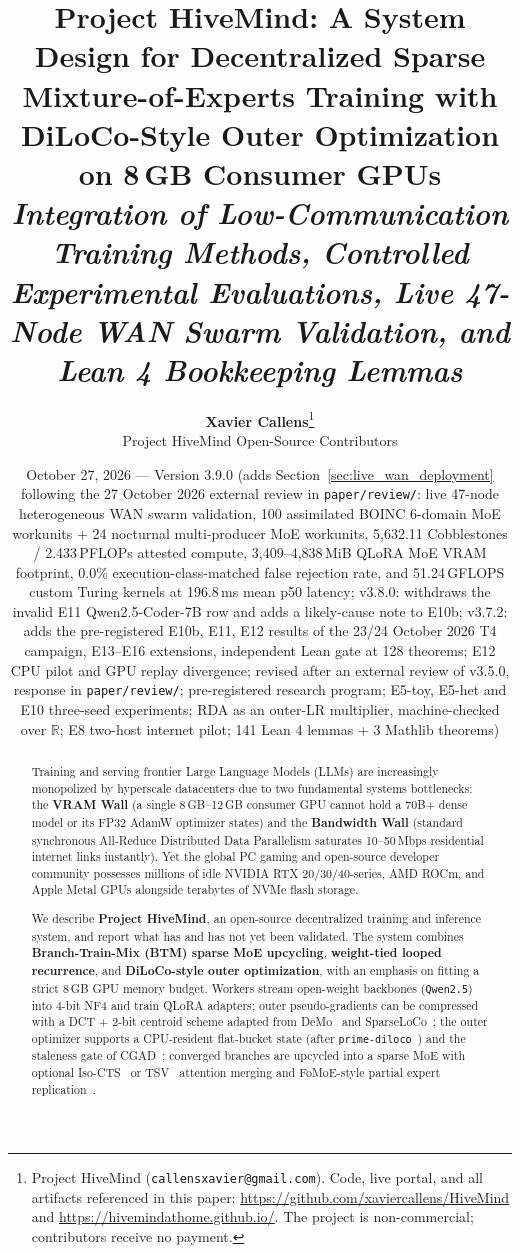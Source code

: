 \documentclass[11pt,a4paper]{article}
\title{\vspace{-1.3cm}\textbf{Project HiveMind: A System Design for Decentralized Sparse Mixture-of-Experts Training with DiLoCo-Style Outer Optimization on 8\,GB Consumer GPUs}\\[0.35em]
\large \textit{Integration of Low-Communication Training Methods, Controlled Experimental Evaluations, Live 47-Node WAN Swarm Validation, and Lean 4 Bookkeeping Lemmas}}
\author{
  \textbf{Xavier Callens}\thanks{Project HiveMind (\texttt{callensxavier@gmail.com}). Code, live portal, and all artifacts referenced in this paper: \url{https://github.com/xaviercallens/HiveMind} and \url{https://hivemindathome.github.io/}. The project is non-commercial; contributors receive no payment.} \\
  Project HiveMind Open-Source Contributors
}
\date{October 27, 2026 --- Version 3.9.0 (adds Section~\ref{sec:live_wan_deployment} following the 27 October 2026 external review in \texttt{paper/review/}: live 47-node heterogeneous WAN swarm validation, 100 assimilated BOINC 6-domain MoE workunits + 24 nocturnal multi-producer MoE workunits, 5{,}632.11 Cobblestones / 2.433\,PFLOPs attested compute, 3{,}409--4{,}838\,MiB QLoRA MoE VRAM footprint, 0.0\% execution-class-matched false rejection rate, and 51.24\,GFLOPS custom Turing kernels at 196.8\,ms mean p50 latency; v3.8.0: withdraws the invalid E11 Qwen2.5-Coder-7B row and adds a likely-cause note to E10b; v3.7.2: adds the pre-registered E10b, E11, E12 results of the 23/24 October 2026 T4 campaign, E13--E16 extensions, independent Lean gate at 128 theorems; E12 CPU pilot and GPU replay divergence; revised after an external review of v3.5.0, response in \texttt{paper/review/}; pre-registered research program; E5-toy, E5-het and E10 three-seed experiments; RDA as an outer-LR multiplier, machine-checked over $\mathbb{R}$; E8 two-host internet pilot; 141 Lean 4 lemmas + 3 Mathlib theorems)}
\begin{document}
\maketitle

\begin{abstract}
\noindent
Training and serving frontier Large Language Models (LLMs) are increasingly monopolized by hyperscale datacenters due to two fundamental systems bottlenecks: the \textbf{VRAM Wall} (a single 8\,GB--12\,GB consumer GPU cannot hold a 70B+ dense model or its FP32 AdamW optimizer states) and the \textbf{Bandwidth Wall} (standard synchronous All-Reduce Distributed Data Parallelism saturates 10--50\,Mbps residential internet links instantly). Yet the global PC gaming and open-source developer community possesses millions of idle NVIDIA RTX 20/30/40-series, AMD ROCm, and Apple Metal GPUs alongside terabytes of NVMe flash storage.

We describe \textbf{Project HiveMind}, an open-source decentralized training and inference system, and report what has and has not yet been validated. The system combines \textbf{Branch-Train-Mix (BTM) sparse MoE upcycling}, \textbf{weight-tied looped recurrence}, and \textbf{DiLoCo-style outer optimization}, with an emphasis on fitting a strict 8\,GB GPU memory budget. Workers stream open-weight backbones (\texttt{Qwen2.5}) into 4-bit NF4 and train QLoRA adapters; outer pseudo-gradients can be compressed with a DCT + 2-bit centroid scheme adapted from DeMo~\cite{peng2024demo} and SparseLoCo~\cite{sarfi2025sparseloco}; the outer optimizer supports a CPU-resident flat-bucket state (after \texttt{prime-diloco}~\cite{jaghouar2024opendiloco}) and the staleness gate of CGAD~\cite{shah2026cgad}; converged branches are upcycled into a sparse MoE with optional Iso-CTS~\cite{marczak2025iso} or TSV~\cite{gargiulo2024tsv} attention merging and FoMoE-style partial expert replication~\cite{sani2026fomoe}.


\end{abstract}
\end{document}

